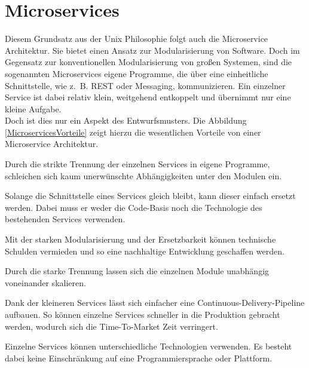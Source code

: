 \section{Microservices}


Diesem Grundsatz aus der Unix Philosophie folgt auch die Microservice Architektur. Sie bietet einen Ansatz zur Modularisierung von Software. Doch im Gegensatz zur konventionellen Modularisierung von großen Systemen, sind die sogenannten Microservices eigene Programme\cite[10]{Wolff2015}, die über eine einheitliche Schnittstelle, wie z.~B. \ac{REST} oder Messaging, kommunizieren. Ein einzelner Service ist dabei relativ klein, weitgehend entkoppelt und  übernimmt nur eine kleine Aufgabe.\\
Doch ist dies nur ein Aspekt des Entwurfsmusters. Die Abbildung \ref{MicroservicesVorteile} zeigt hierzu die wesentlichen Vorteile von einer Microservice Architektur.


\begin{description}[leftmargin=!,labelwidth=\widthof{\bfseries Ergänzung Legacy-Systeme}]
	\item[Starke Modularisierung] 
	 	Durch die strikte Trennung der einzelnen Services in eigene Programme, schleichen sich kaum unerwünschte Abhängigkeiten unter den Modulen ein.
	\item[Ersetzbarkeit]
		Solange die Schnittstelle eines Services gleich bleibt, kann dieser einfach ersetzt werden. Dabei muss er weder die Code-Basis noch die Technologie des bestehenden Services verwenden.
	\item[Nachhaltige Entwicklung] 
		Mit der starken Modularisierung und der Ersetzbarkeit können technische Schulden vermieden und so eine nachhaltige Entwicklung geschaffen werden.
	\item[Effiziente Skalierung]
		Durch die starke Trennung lassen sich die einzelnen Module unabhängig voneinander skalieren.
	\item[Continuous Delivery]
		Dank der kleineren Services lässt sich einfacher eine Continuous-Delivery-Pipeline aufbauen. So können einzelne Services schneller in die Produktion gebracht werden, wodurch sich die Time-To-Market Zeit verringert. 
	\item[Technologie Freiheit]
		Einzelne Services können unterschiedliche Technologien verwenden. Es besteht dabei keine Einschränkung auf eine Programmiersprache oder Plattform.
\end{description}

